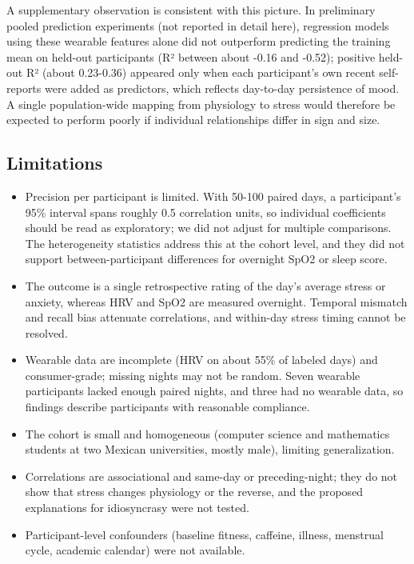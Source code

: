 \documentclass[11pt, a4paper, oneside]{article}
\begin{document}
A supplementary observation is consistent with this picture. In preliminary pooled prediction experiments (not reported in detail here), regression models using these wearable features alone did not outperform predicting the training mean on held-out participants (R² between about -0.16 and -0.52); positive held-out R² (about 0.23-0.36) appeared only when each participant's own recent self-reports were added as predictors, which reflects day-to-day persistence of mood. A single population-wide mapping from physiology to stress would therefore be expected to perform poorly if individual relationships differ in sign and size.

\subsection{Limitations}

\begin{itemize}
  \item Precision per participant is limited. With 50-100 paired days, a participant's 95\% interval spans roughly 0.5 correlation units, so individual coefficients should be read as exploratory; we did not adjust for multiple comparisons. The heterogeneity statistics address this at the cohort level, and they did not support between-participant differences for overnight SpO2 or sleep score.
  \item The outcome is a single retrospective rating of the day's average stress or anxiety, whereas HRV and SpO2 are measured overnight. Temporal mismatch and recall bias attenuate correlations, and within-day stress timing cannot be resolved.
  \item Wearable data are incomplete (HRV on about 55\% of labeled days) and consumer-grade; missing nights may not be random. Seven wearable participants lacked enough paired nights, and three had no wearable data, so findings describe participants with reasonable compliance.
  \item The cohort is small and homogeneous (computer science and mathematics students at two Mexican universities, mostly male), limiting generalization.
  \item Correlations are associational and same-day or preceding-night; they do not show that stress changes physiology or the reverse, and the proposed explanations for idiosyncrasy were not tested.
  \item Participant-level confounders (baseline fitness, caffeine, illness, menstrual cycle, academic calendar) were not available.
\end{itemize}
\end{document}
